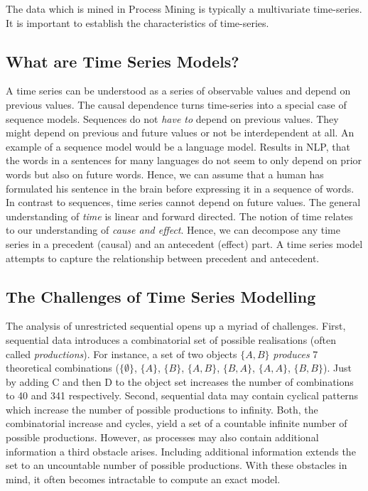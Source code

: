 \documentclass[./../../paper.tex]{subfiles}
\begin{document}
The data which is mined in Process Mining is typically a multivariate time-series. It is important to establish the characteristics of time-series.

\subsection{What are Time Series Models?}
A time series can be understood as a series of observable values and depend on previous values. The causal dependence turns time-series into a special case of sequence models. Sequences do not \emph{have to} depend on previous values. They might depend on previous and future values or not be interdependent at all. An example of a sequence model would be a language model. Results in \gls{NLP}, that the words in a sentences for many languages do not seem to only depend on prior words but also on future words\needscite. Hence, we can assume that a human has formulated his sentence in the brain before expressing it in a sequence of words\needscite. In contrast to sequences, time series cannot depend on future values. The general understanding of \emph{time} is linear and forward directed\needscite. The notion of time relates to our understanding of \emph{cause and effect}. Hence, we can decompose any time series in a precedent (causal) and an antecedent (effect) part. A time series model attempts to capture the relationship between precedent and antecedent.

\subsection{The Challenges of Time Series Modelling}
The analysis of unrestricted sequential opens up a myriad of challenges. First, sequential data introduces a combinatorial set of possible realisations (often called \emph{productions}). For instance, a set of two objects $\{A,B\}$ \emph{produces} 7 theoretical combinations ($\{\emptyset\}$, $\{A\}$, $\{B\}$, $\{A,B\}$, $\{B,A\}$, $\{A,A\}$, $\{B,B\}$). Just by adding C and then D to the object set increases the number of combinations to 40 and 341 respectively. %
Second, sequential data may contain cyclical patterns which increase the number of possible productions to infinity\needscite. Both, the combinatorial increase and cycles, yield a set of a countable infinite number of possible productions. However, as processes may also contain additional information a third obstacle arises. Including additional information extends the set to an uncountable number of possible productions. With these obstacles in mind, it often becomes intractable to compute an exact model.
\end{document}
